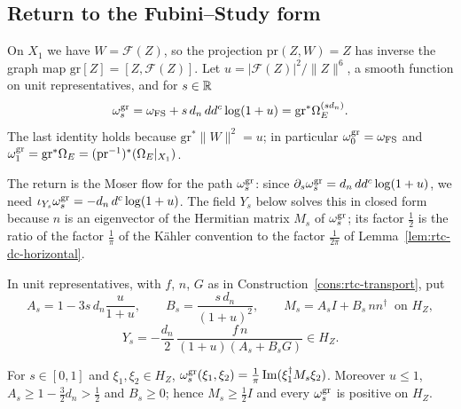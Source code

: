 \subsection{Return to the Fubini--Study form}\label{sec:rtc-return}

On $X_1$ we have $W=\mathcal F(Z)$, so the projection $\mathrm{pr}(Z,W)=Z$ has inverse the graph map
$\mathrm{gr}[Z]=[Z,\mathcal F(Z)]$. Let $u=|\mathcal F(Z)|^2/\|Z\|^6$, a smooth function on unit representatives, and for $s\in\mathbb{R}$
\[
 \omega^{\rm gr}_s=\omega_{\rm FS}+s\,d_n\,dd^c\log(1+u)=\mathrm{gr}^*\Omega_E^{(sd_n)} .
\]
The last identity holds because $\mathrm{gr}^*\|W\|^2=u$; in particular $\omega^{\rm gr}_0=\omega_{\rm FS}$ and
$\omega^{\rm gr}_1=\mathrm{gr}^*\Omega_E=(\mathrm{pr}^{-1})^*(\Omega_E|_{X_1})$.

The return is the Moser flow for the path $\omega^{\rm gr}_s$: since $\partial_s\omega^{\rm gr}_s=d_n\,dd^c\log(1+u)$, we need
$\iota_{Y_s}\omega^{\rm gr}_s=-d_n\,d^c\log(1+u)$. The field $Y_s$ below solves this in closed form because $n$ is an
eigenvector of the Hermitian matrix $M_s$ of $\omega^{\rm gr}_s$; its factor $\frac12$ is the ratio of the factor $\frac1\pi$
of the K\"ahler convention to the factor $\frac1{2\pi}$ of Lemma~\ref{lem:rtc-dc-horizontal}.

\begin{construction}\label{cons:rtc-return}
In unit representatives, with $f$, $n$, $G$ as in Construction~\ref{cons:rtc-transport}, put
\[
 A_s=1-3s\,d_n\frac{u}{1+u},\qquad B_s=\frac{s\,d_n}{(1+u)^2},\qquad M_s=A_sI+B_s\,nn^\dagger\ \text{ on }H_Z,
\]
\begin{equation}\label{eq:rtc-return-field}
 Y_s=-\frac{d_n}{2}\,\frac{f\,n}{(1+u)(A_s+B_sG)}\in H_Z .
\end{equation}
\end{construction}

\begin{lemma}\label{lem:rtc-graph}
For $s\in[0,1]$ and $\xi_1,\xi_2\in H_Z$, $\omega^{\rm gr}_s(\xi_1,\xi_2)=\frac1\pi\operatorname{Im}(\xi_1^\dagger M_s\xi_2)$. Moreover
$u\le1$, $A_s\ge1-\frac32d_n>\frac12$ and $B_s\ge0$; hence $M_s\ge\frac12I$ and every $\omega^{\rm gr}_s$ is positive on $H_Z$.
\end{lemma}

